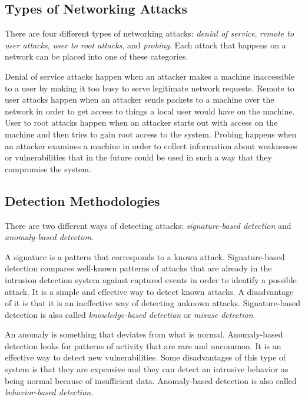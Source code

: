 \documentclass{sig-alternate}
\begin{document}
\subsection{Types of Networking Attacks}
There are four different types of networking attacks: \emph{denial of service}, \emph{remote to user attacks}, \emph{user to root attacks}, and \emph{probing}. Each attack that happens on a network can be placed into one of these categories. 

Denial of service attacks happen when an attacker makes a machine inaccessible to a user by making it too busy to serve legitimate network requests. Remote to user attacks happen when an attacker sends packets to a machine over the network in order to get access to things a local user would have on the machine. User to root attacks happen when an attacker starts out with access on the machine and then tries to gain root access to the system. Probing happens when an attacker examines a machine in order to collect information about weaknesses or vulnerabilities that in the future could be used in such a way that they compromise the system.~\cite{DBLP:journals/corr/abs-1204-1336}




\subsection{Detection Methodologies}
There are two different ways of detecting attacks: \emph{signature-based detection} and \emph{anomaly-based detection}. 

A signature is a pattern that corresponds to a known attack. Signature-based detection compares well-known patterns of attacks that are already in the intrusion detection system against captured events in order to identify a possible attack. It is a simple and effective way to detect known attacks. A disadvantage of it is that it is an ineffective way of detecting unknown attacks. Signature-based detection is also called \emph{knowledge-based detection} or \emph{misuse detection}.~\cite{Liao201316}

An anomaly is something that deviates from what is normal. Anomaly-based detection looks for patterns of activity that are rare and uncommon. It is an effective way to detect new vulnerabilities. Some disadvantages of this type of system is that they are expensive and they can detect an intrusive behavior as being normal because of insufficient data. Anomaly-based detection is also called \emph{behavior-based detection}.~\cite{DBLP:journals/corr/abs-1204-1336}
\end{document}
